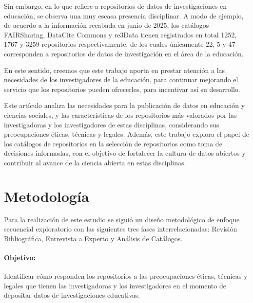 \documentclass[runningheads]{llncs}
\begin{document}
Sin embargo, en lo que refiere a repositorios de datos de investigaciones en educación, se observa una muy escasa presencia disciplinar. A modo de ejemplo, de acuerdo a la información recabada en junio de 2025, los catálogos FAIRSharing, DataCite Commons y re3Data tienen registrados en total 1252, 1767 y 3259 repositorios respectivamente, de los cuales únicamente 22, 5 y 47 corresponden a repositorios de datos de investigación en el área de la educación.

En este sentido, creemos que este trabajo aporta en prestar atención a las necesidades de los investigadores de la educación, para continuar mejorando el servicio que los repositorios pueden ofrecerles, para incentivar así su desarrollo.

Este artículo analiza las necesidades para la publicación de datos en educación y ciencias sociales, y las características  de los repositorios más valorados por las investigadoras y los investigadores de estas disciplinas, considerando sus preocupaciones éticas, técnicas y legales. Además, este trabajo explora el papel de los catálogos de repositorios en la selección de repositorios como toma de decisiones informadas, con el objetivo de fortalecer la cultura de datos abiertos y contribuir al avance de la ciencia abierta en estas disciplinas.\\

\section{Metodología}
\label{Metodo}
Para la realización de este estudio se siguió un diseño metodológico de enfoque secuencial exploratorio con las siguientes tres fases interrelacionadas: Revisión Bibliográfica, Entrevista a Experto y Análisis de Catálogos.

\paragraph{Objetivo:} Identificar cómo responden los repositorios a las preocupaciones  éticas, técnicas y legales que tienen las investigadoras y los investigadores en el momento de depositar datos de investigaciones educativas.
\end{document}
